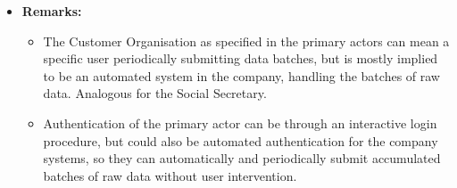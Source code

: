 \documentclass[a4paper,10pt]{article}
\begin{document}
\begin{itemize}
    \item \textbf{Remarks:}
        \begin{itemize}
            \item The Customer Organisation as specified in the primary actors can mean a specific user periodically submitting data batches, but is mostly implied to be an automated system in the company, handling the batches of raw data. Analogous for the Social Secretary.
            \item Authentication of the primary actor can be through an interactive login procedure, but could also be automated authentication for the company systems, so they can automatically and periodically submit accumulated batches of raw data without user intervention.
        \end{itemize}
\end{itemize}
\end{document}
